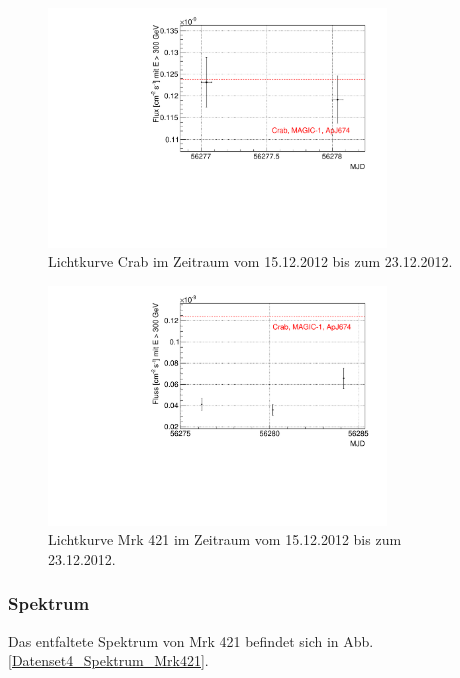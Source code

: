 \begin{figure}
    \centering
    \includegraphics[width=0.8\textwidth]{./Plots/04_MrkAnalyse/Datenset4/Datenset4_LC_Crab.pdf}
    \caption{Lichtkurve Crab im Zeitraum vom 15.12.2012 bis zum 23.12.2012.}
    \label{Datenset4_LC_Crab}
\end{figure}

\begin{figure}
    \centering
    \includegraphics[width=0.8\textwidth]{./Plots/04_MrkAnalyse/Datenset4/Datenset4_LC_Mrk421.pdf}
    \caption{Lichtkurve Mrk 421 im Zeitraum vom 15.12.2012 bis zum 23.12.2012.}
    \label{Datenset4_LC_Mrk421}
\end{figure}


\subsubsection{Spektrum}
Das entfaltete Spektrum von Mrk 421 befindet sich in Abb.\ref{Datenset4_Spektrum_Mrk421}.


